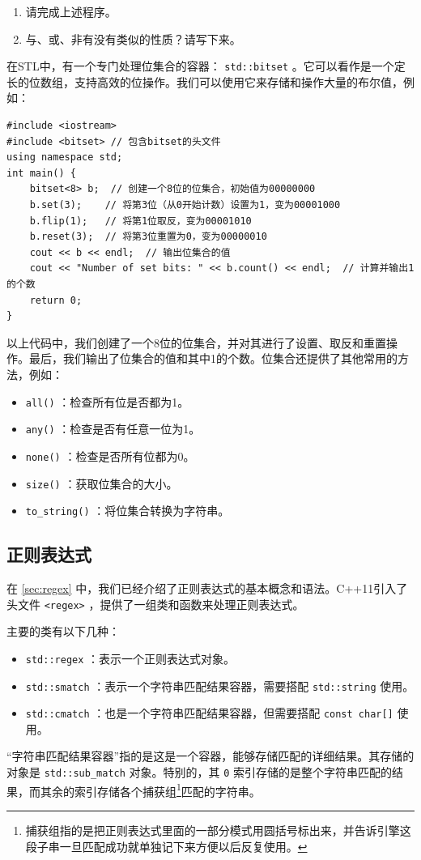 \begin{exercise}
  \begin{enumerate}
    \item 请完成上述程序。
    \item 与、或、非有没有类似的性质？请写下来。
  \end{enumerate}
\end{exercise}

在STL中，有一个专门处理位集合的容器： \texttt{std::bitset} 。它可以看作是一个定长的位数组，支持高效的位操作。我们可以使用它来存储和操作大量的布尔值，例如：
\begin{verbatim}
#include <iostream>
#include <bitset> // 包含bitset的头文件
using namespace std;
int main() {
    bitset<8> b;  // 创建一个8位的位集合，初始值为00000000
    b.set(3);    // 将第3位（从0开始计数）设置为1，变为00001000
    b.flip(1);   // 将第1位取反，变为00001010
    b.reset(3);  // 将第3位重置为0，变为00000010
    cout << b << endl;  // 输出位集合的值
    cout << "Number of set bits: " << b.count() << endl;  // 计算并输出1的个数
    return 0;
}
\end{verbatim}
以上代码中，我们创建了一个8位的位集合，并对其进行了设置、取反和重置操作。最后，我们输出了位集合的值和其中1的个数。位集合还提供了其他常用的方法，例如：
\begin{itemize}
  \item  \texttt{all()} ：检查所有位是否都为1。
  \item  \texttt{any()} ：检查是否有任意一位为1。
  \item  \texttt{none()} ：检查是否所有位都为0。
  \item  \texttt{size()} ：获取位集合的大小。
  \item  \texttt{to\_string()} ：将位集合转换为字符串。
\end{itemize}

\subsection{正则表达式}

在 \ref{sec:regex} 中，我们已经介绍了正则表达式的基本概念和语法。C++11引入了头文件 \texttt{<regex>} ，提供了一组类和函数来处理正则表达式。

主要的类有以下几种：
\begin{itemize}
  \item  \texttt{std::regex} ：表示一个正则表达式对象。
  \item  \texttt{std::smatch} ：表示一个字符串匹配结果容器，需要搭配 \texttt{std::string} 使用。
  \item  \texttt{std::cmatch} ：也是一个字符串匹配结果容器，但需要搭配 \texttt{const char[]} 使用。
\end{itemize}
“字符串匹配结果容器”指的是这是一个容器，能够存储匹配的详细结果。其存储的对象是 \texttt{std::sub\_match} 对象。特别的，其 \texttt{0} 索引存储的是整个字符串匹配的结果，而其余的索引存储各个捕获组\footnote{捕获组指的是把正则表达式里面的一部分模式用圆括号标出来，并告诉引擎这段子串一旦匹配成功就单独记下来方便以后反复使用。}匹配的字符串。


